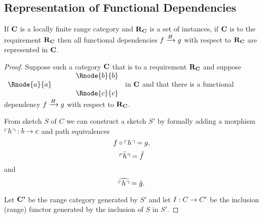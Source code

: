 
\subsection{Representation of Functional Dependencies}

\begin{lemma}
If $\catc$ is a locally finite range category and $\reqtc$ is a set of instances, if $\catc$ is 
 to the requirement $\reqtc$ then
all functional dependencies $\fundep{H}{f}{g}$  with respect to $\reqtc$ are represented in $\catc$.
\end{lemma}
\begin{proof}
Suppose such a category  $\catc$  that  is 
 to a requirement $\reqtc$ and suppose
$
\begin{array}{c p{0.5cm} c  }
             &&   \Rnode{b}{b} \\[0.01cm]
\Rnode{a}{a} &&                \\[0.01cm] 
             &&   \Rnode{c}{c}         
\end{array} 
$
in $\catc$ 
and that there is a functional dependency $\fundep{H}{f}{g}$ with respect to $\reqtc$.

From sketch $S$ of $C$ we can construct a sketch $S'$ by formally 
adding a morphism $\qq{h}: b \morph c$
and path equivalences 
\begin{equation}
\label{hquote}
f \circ \qq{h} = g,
\end{equation} 
\begin{equation}
\label{hquotebar}
\bar{\qq{h}}=\hat{f}
\end{equation} 
and 
\begin{equation}
\label{hquotehat}
\widehat{\qq{h}}=\hat{g}. 
\end{equation}

Let $\catcp$ be the range category generated by $S'$ and
let $I: C \morph C'$ be the inclusion (range) functor 
generated by the inclusion of $S$ in $S'$. 


\end{proof}
